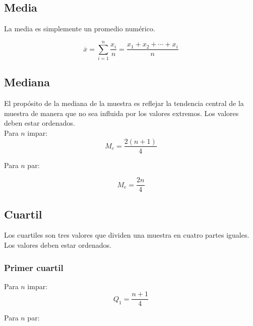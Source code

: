 \documentclass{report}
\begin{document}
      \subsection*{Media}
        La media es simplemente un promedio numérico.

        \begin{equation*}
          \overline{x}=\sum_{i = 1}^n\frac{x_i}{n}=\frac{x_1+x_2+\dotsm+x_i}{n}
        \end{equation*}

        \subsection*{Mediana}
          El propósito de la mediana de la muestra es reflejar la tendencia central 
          de la muestra de manera que no sea influida por los valores extremos. Los
          valores deben estar ordenados.\\
          \indent Para $n$ impar:
          \begin{equation*}
            M_e=\frac{2(n+1)}{4}
          \end{equation*}

          Para $n$ par:

          \begin{equation*}
            M_e=\frac{2n}{4}
          \end{equation*}
       
        \subsection*{Cuartil}
          Los cuartiles son tres valores que dividen una muestra en cuatro partes
          iguales. Los valores deben estar ordenados.
          
          \subsubsection*{Primer cuartil}
          
            \indent Para $n$ impar:
            \begin{equation*}
              Q_1=\frac{n+1}{4}
            \end{equation*}

            Para $n$ par:
\end{document}
